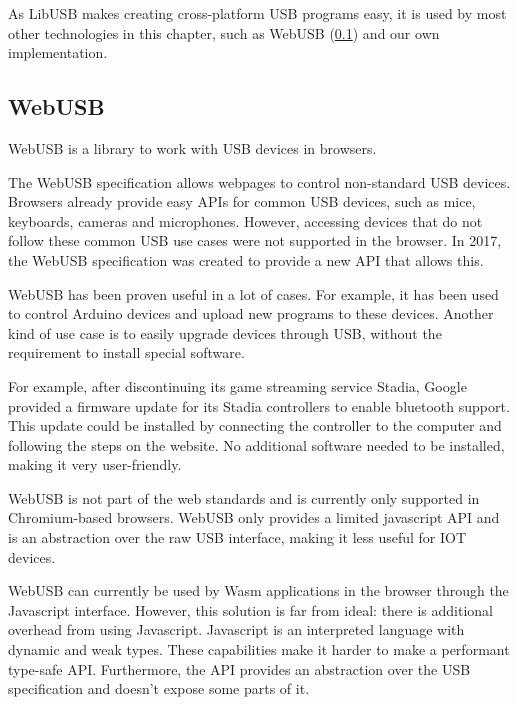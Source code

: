 As LibUSB makes creating cross-platform USB programs easy, it is used by most other technologies in this chapter, such as WebUSB (\ref{section:WebUSB}) and our own implementation.

\subsection{WebUSB}
\label{section:WebUSB}

WebUSB \cite{WebUSB} is a library to work with USB devices in browsers.

The WebUSB specification allows webpages to control non-standard USB devices. Browsers already provide easy APIs for common USB devices, such as mice, keyboards, cameras and microphones. However, accessing devices that do not follow these common USB use cases were not supported in the browser. In 2017, the WebUSB specification was created to provide a new API that allows this.

WebUSB has been proven useful in a lot of cases. For example, it has been used to control Arduino devices and upload new programs to these devices. Another kind of use case is to easily upgrade devices through USB, without the requirement to install special software. 

For example, after discontinuing its game streaming service Stadia, Google provided a firmware update for its Stadia controllers to enable bluetooth support. This update could be installed by connecting the controller to the computer and following the steps on the website. No additional software needed to be installed, making it very user-friendly.

WebUSB is not part of the web standards and is currently only supported in Chromium-based browsers. WebUSB only provides a limited javascript API and is an abstraction over the raw USB interface, making it less useful for IOT devices.

WebUSB can currently be used by Wasm applications in the browser through the Javascript interface. However, this solution is far from ideal: there is additional overhead from using Javascript. Javascript is an interpreted language with dynamic and weak types. These capabilities make it harder to make a performant type-safe API. Furthermore, the API provides an abstraction over the USB specification and doesn't expose some parts of it.